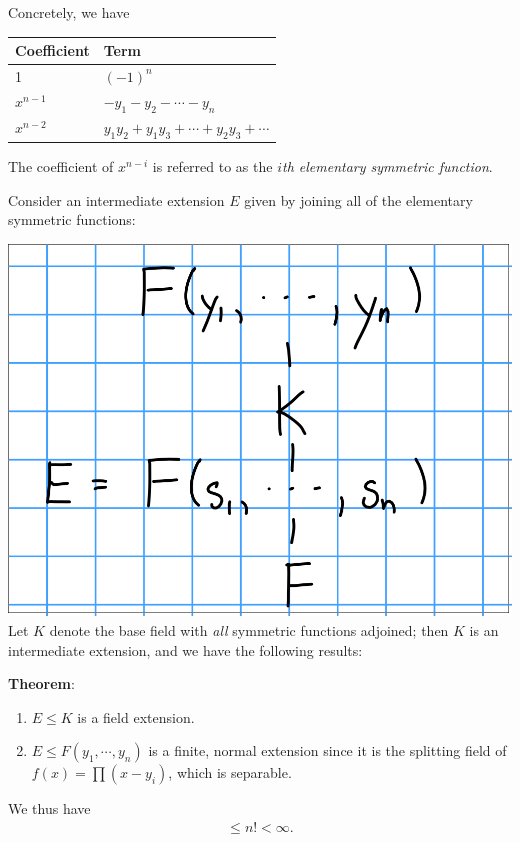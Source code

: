 Concretely, we have

\begin{longtable}[]{@{}ll@{}}
\toprule
Coefficient & Term\tabularnewline
\midrule
\endhead
1 & \((-1)^n\)\tabularnewline
\(x^{n-1}\) & \(-y_1 - y_2 - \cdots - y_n\)\tabularnewline
\(x^{n-2}\) &
\(y_1y_2 + y_1y_3 + \cdots + y_2y_3 + \cdots\)\tabularnewline
\bottomrule
\end{longtable}

The coefficient of \(x^{n-i}\) is referred to as the \emph{\(i\)th
elementary symmetric function}.

Consider an intermediate extension \(E\) given by joining all of the
elementary symmetric functions:

\includegraphics{figures/2019-10-17-09:56.png}\\

Let \(K\) denote the base field with \emph{all} symmetric functions
adjoined; then \(K\) is an intermediate extension, and we have the
following results:

\textbf{Theorem}:

\begin{enumerate}
\def\labelenumi{\arabic{enumi}.}
\item
  \(E \leq K\) is a field extension.
\item
  \(E \leq F(y_1, \cdots, y_n)\) is a finite, normal extension since it
  is the splitting field of \(f(x) = \prod (x-y_i)\), which is
  separable.
\end{enumerate}

We thus have
\begin{align*}
[F(y_1, \cdots, y_n): E] \leq n! < \infty
.\end{align*}

